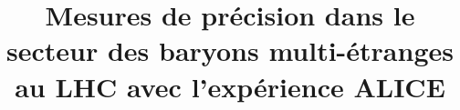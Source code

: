 \documentclass[ALICE,manyauthors]{cernphprep_ResumeInFrench}
\begin{document}
%



\begin{titlepage}
	
	\title{\color{RoyalBlue4}Mesures de précision dans le secteur des baryons multi-étranges au LHC avec l'expérience ALICE}
	
%

\end{titlepage}
\setcounter{page}{2}




%




\cleardoublepage 
{} 



\cleardoublepage
{}


\end{document}
